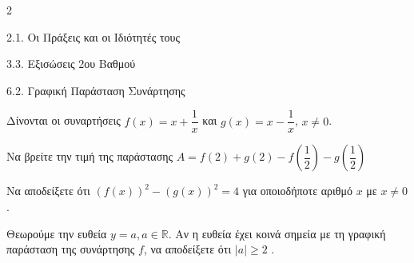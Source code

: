 \begin{ylh}{2}
    \item 2.1. Οι Πράξεις και οι Ιδιότητές τους
    \item 3.3. Εξισώσεις 2ου Βαθμού
    \item 6.2. Γραφική Παράσταση Συνάρτησης
\end{ylh}
Δίνονται οι συναρτήσεις $f(x) = x + \dfrac{1}{x}$ και $g(x) = x - \dfrac{1}{x}$, $x \neq 0$.

\begin{alist}
\item Να βρείτε την τιμή της παράστασης
$A = f(2) + g(2) - f\left(\dfrac{1}{2}\right) - g\left(\dfrac{1}{2}\right)$
\item Να αποδείξετε ότι $(f(x))^2 - (g(x))^2 = 4$ για οποιοδήποτε αριθμό $x$ με $x \neq 0$.
\item Θεωρούμε την ευθεία $y = a, a \in \mathbb{R}$. Αν η ευθεία έχει κοινά σημεία με τη γραφική παράσταση της συνάρτησης $f$, να αποδείξετε ότι $|a| \ge 2$ .
\end{alist}

